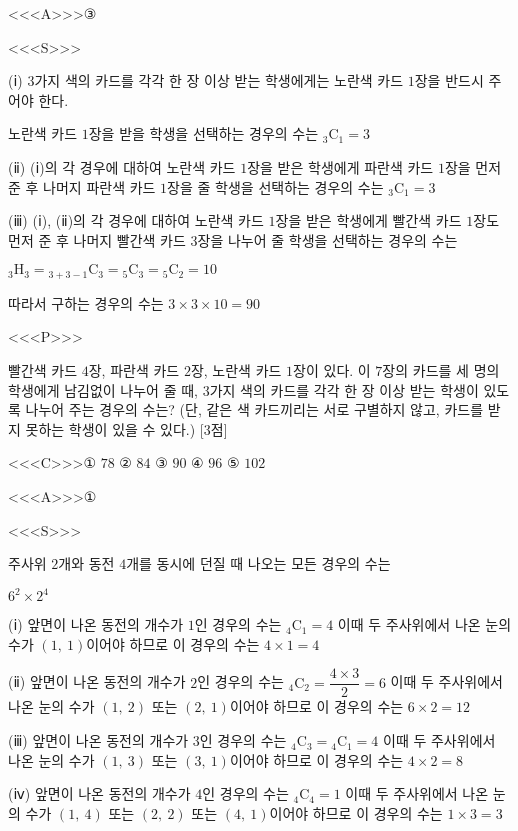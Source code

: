 \documentclass{oblivoir}
\begin{document}
<<<A>>>③

<<<S>>>

(ⅰ) $3$가지 색의 카드를 각각 한 장 이상 받는 학생에게는 노란색 카드 $1$장을 반드시 주어야 한다.

노란색 카드 $1$장을 받을 학생을 선택하는 경우의 수는 ${}_{3}\mathrm{C}_{1}= 3$

(ⅱ) (ⅰ)의 각 경우에 대하여 노란색 카드 $1$장을 받은 학생에게 파란색 카드 $1$장을 먼저 준 후 나머지 파란색 카드 $1$장을 줄 학생을 선택하는 경우의 수는 ${}_{3}\mathrm{C}_{1}=3$

(ⅲ) (ⅰ), (ⅱ)의 각 경우에 대하여 노란색 카드 $1$장을 받은 학생에게 빨간색 카드 $1$장도 먼저 준 후 나머지 빨간색 카드 $3$장을 나누어 줄 학생을 선택하는 경우의 수는 

${}_{3}\mathrm{H}_{3}={}_{3+3-1}\mathrm{C}_{3}={}_{5}\mathrm{C}_{3}={}_{5}\mathrm{C}_{2}=10$

따라서 구하는 경우의 수는 $3\times 3\times 10 =90$

<<<P>>>

빨간색 카드 $4$장, 파란색 카드 $2$장, 노란색 카드 $1$장이 있다. 이 $7$장의 카드를 세 명의 학생에게 남김없이 나누어 줄 때, $3$가지 색의 카드를 각각 한 장 이상 받는 학생이 있도록 나누어 주는 경우의 수는? (단, 같은 색 카드끼리는 서로 구별하지 않고, 카드를 받지 못하는 학생이 있을 수 있다.) [3점]

<<<C>>>① $78$ ② $84$ ③ $90$ ④ $96$ ⑤ $102$

<<<A>>>①

<<<S>>>

주사위 $2$개와 동전 $4$개를 동시에 던질 때 나오는 모든 경우의 수는

$6^{2}\times 2^{4}$

(ⅰ) 앞면이 나온 동전의 개수가 $1$인 경우의 수는
${}_{4}\mathrm{C}_{1}=4$
이때 두 주사위에서 나온 눈의 수가 $(1,\:1)$이어야 하므로 이 경우의 수는 $4\times 1=4$

(ⅱ) 앞면이 나온 동전의 개수가 $2$인 경우의 수는
${}_{4}\mathrm{C}_{2}=\dfrac{4\times 3}{2}=6$
이때 두 주사위에서 나온 눈의 수가 $(1,\:2)$ 또는 $(2,\:1)$이어야 하므로 이 경우의 수는 $6\times 2=12$

(ⅲ) 앞면이 나온 동전의 개수가 $3$인 경우의 수는
${}_{4}\mathrm{C}_{3}={}_{4}\mathrm{C}_{1}=4$
이때 두 주사위에서 나온 눈의 수가 $(1,\:3)$ 또는 $(3,\:1)$이어야 하므로 이 경우의 수는 $4\times 2=8$

(ⅳ) 앞면이 나온 동전의 개수가 $4$인 경우의 수는
${}_{4}\mathrm{C}_{4}=1$
이때 두 주사위에서 나온 눈의 수가 $(1,\:4)$ 또는 $(2,\:2)$ 또는 $(4,\:1)$이어야 하므로 이 경우의 수는 $1\times 3=3$
\end{document}
